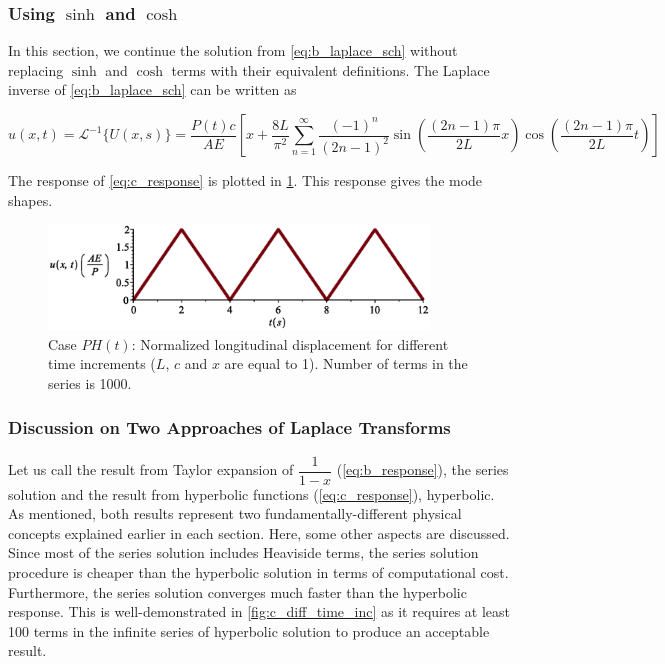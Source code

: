 \documentclass{article}
\begin{document}
\subsubsection{Using $\sinh$ and $\cosh$}
In this section, we continue the solution from \cref{eq:b_laplace_sch} without replacing $\sinh$ and $\cosh$ terms with their equivalent definitions. The Laplace inverse of \cref{eq:b_laplace_sch} can be written as \cite{Spiegel1965}

\begin{equation}
    u(x, t) = \mathcal{L}^{-1}\{ U(x, s) \} = \frac{P(t) c}{AE} \left[ x + \frac{8L}{\pi^2} \sum_{n = 1}^{\infty} \frac{(-1)^n}{(2n - 1)^2} \sin \left( \frac{(2n-1)\pi}{2L}x\right) \cos \left( \frac{(2n-1)\pi}{2L}t\right) \right]
    \label{eq:c_response}
\end{equation}

The response of \cref{eq:c_response} is plotted in \cref{fig:c_u}. This response gives the mode shapes.

\begin{figure}[H]
    \centering
    \includegraphics[width = 0.9\textwidth ]{figures/c_u.eps}
    \caption{Case $P H(t)$: Normalized longitudinal displacement for different time increments ($L$, $c$ and $x$ are equal to 1). Number of terms in the series is 1000.}
    \label{fig:c_u}
\end{figure}

\subsubsection{Discussion on Two Approaches of Laplace Transforms}
Let us call the result from Taylor expansion of $\dfrac{1}{1 - x}$ (\cref{eq:b_response}), the series solution and the result from hyperbolic functions (\cref{eq:c_response}), hyperbolic. As mentioned, both results represent two fundamentally-different physical concepts explained earlier in each section. Here, some other aspects are discussed. Since most of the series solution includes Heaviside terms, the series solution procedure is cheaper than the hyperbolic solution in terms of computational cost. Furthermore, the series solution converges much faster than the hyperbolic response. This is well-demonstrated in \cref{fig:c_diff_time_inc} as it requires at least 100 terms in the infinite series of hyperbolic solution to produce an acceptable result. \\
\end{document}
